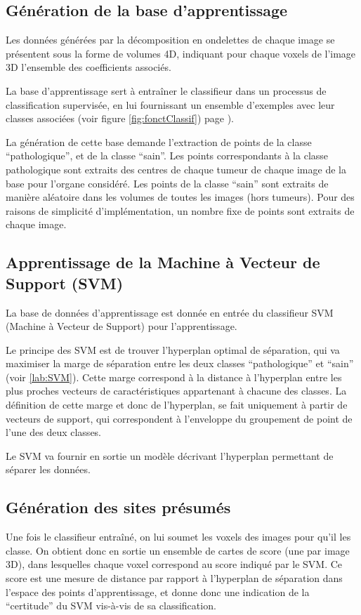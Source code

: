 \subsection{Génération de la base d'apprentissage}
Les données générées par la décomposition en ondelettes de chaque image se présentent sous la forme de volumes 4D, indiquant pour chaque voxels de l'image 3D l'ensemble des coefficients associés.

La base d'apprentissage sert à entraîner le classifieur dans un processus de classification supervisée, en lui fournissant un ensemble d'exemples avec leur classes associées (voir figure \ref{fig:fonctClassif}) page \pageref{fig:fonctClassif}).

La génération de cette base demande l'extraction de points de la classe ``pathologique'', et de la classe ``sain''. Les points correspondants à la classe pathologique sont extraits des centres de chaque tumeur de chaque image de la base pour l'organe considéré. Les points de la classe ``sain'' sont extraits de manière aléatoire dans les volumes de toutes les images (hors tumeurs). Pour des raisons de simplicité d'implémentation, un nombre fixe de points sont extraits de chaque image.

\subsection{Apprentissage de la Machine à Vecteur de Support (SVM)}

La base de données d'apprentissage est donnée en entrée du classifieur SVM (Machine à Vecteur de Support) pour l'apprentissage.

Le principe des SVM est de trouver l’hyperplan optimal de séparation, qui va maximiser la marge de séparation entre les deux classes ``pathologique''  et ``sain'' (voir \ref{lab:SVM}). Cette marge correspond à la distance à l’hyperplan entre les plus proches vecteurs de caractéristiques appartenant à chacune des classes. La définition de cette marge et donc de l’hyperplan, se fait uniquement à partir de vecteurs de support, qui correspondent à l'enveloppe du groupement de point de l'une des deux classes.

Le SVM va fournir en sortie un modèle décrivant l'hyperplan permettant de séparer les données.

\subsection{Génération des sites présumés}
\label{lab:aggregatsCAD}
Une fois le classifieur entraîné, on lui soumet les voxels des images pour qu'il les classe. On obtient donc en sortie un ensemble de cartes de score (une par image 3D), dans lesquelles chaque voxel correspond au score indiqué par le SVM. Ce score est une mesure de distance par rapport à l'hyperplan de séparation dans l'espace des points d'apprentissage, et donne donc une indication de la ``certitude'' du SVM vis-à-vis de sa classification.

